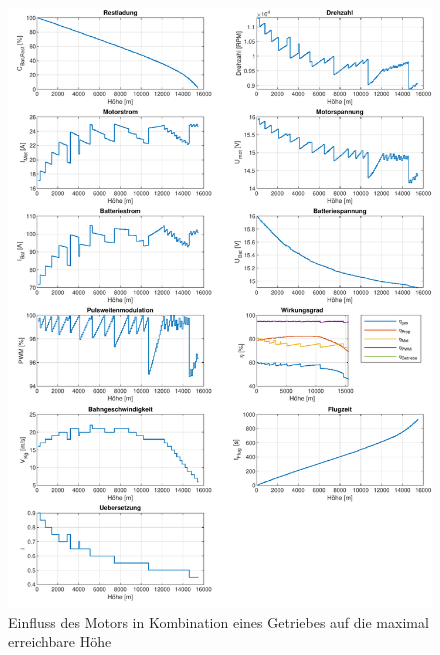 \begin{appendix}
\begin{figure}[H]
\centering
	\includegraphics[scale=0.7]{Diagramme/Getriebe_KV.pdf}
	\caption{Einfluss des Motors in Kombination eines Getriebes auf die maximal erreichbare Höhe}
	\label{abb:getriebe_wirkungsgrade}
\end{figure}
\begin{figure}[H]
\centering

\end{figure}
\end{appendix}
